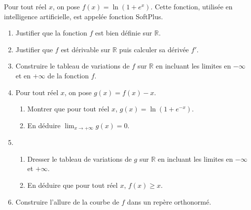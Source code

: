 \documentclass[11pt,fleqn, openany]{book} %
\begin{document}
\begin{exercise}[topic=log03]Pour tout réel $x$, on pose $f(x)=\ln(1+e^x)$. Cette fonction, utilisée en intelligence artificielle, est appelée fonction SoftPlus.
\begin{enumerate}
\item Justifier que la fonction $f$ est bien définie sur $\mathbb{R}$.
\item Justifier que $f$ est dérivable sur $\mathbb{R}$ puis calculer sa dérivée $f'$.
\item Construire le tableau de variations de $f$ sur $\mathbb{R}$ en incluant les limites en $-\infty$ et en $+\infty$ de la fonction $f$.
\item Pour tout réel $x$, on pose $g(x)=f(x)-x$.
\begin{enumerate}
\item Montrer que pour tout réel $x$, $g(x)=\ln(1+e^{-x})$.
\item En déduire $\displaystyle\lim_{x\to +\infty}g(x)=0$. 
\end{enumerate}
\item \begin{enumerate}
\item Dresser le tableau de variations de $g$ sur $\mathbb{R}$ en incluant les limites en $-\infty$ et $+\infty$.
\item En déduire que pour tout réel $x$, $f(x)\geqslant x$.
\end{enumerate}

\item Construire l'allure de la courbe de $f$ dans un repère orthonormé.
\end{enumerate}\end{exercise}
\end{document}
